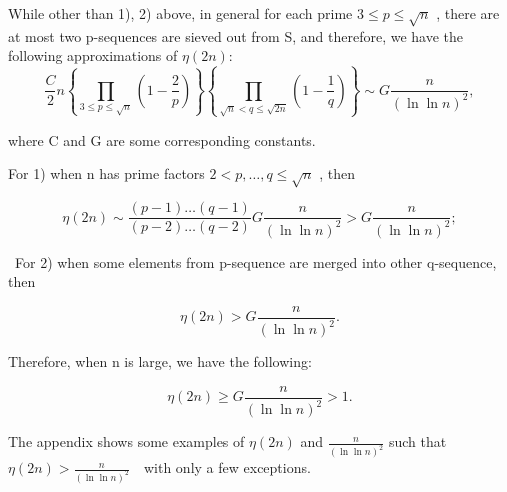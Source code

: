 \documentclass{article}
\begin{document}
\vspace{1\baselineskip}

While other than 1), 2) above, in general for each prime \( 3\leq p\leq\sqrt{n}\) , there are at most two p-sequences are sieved out from S, and therefore, we have the following approximations of \( \eta (2n)\):
\vspace{1\baselineskip}
\begin{equation}
\frac{C }{2} n\left\{  \prod_{3\leq p\leq\sqrt{n}}^{}\left(1-\frac{2}{p}\right)\right\}\left\{ \prod_{\sqrt{n}<q\leq\sqrt{2n}}^{}\left(1-\frac{1}{q}\right)\right\}  \sim  G\frac{n}{(\ln \ln  n)^{2}}   ,
\end{equation}

\vspace{1\baselineskip}

where C and G are some corresponding constants.
\vspace{1\baselineskip}

For 1) when n has prime factors \( 2<p, \ldots , q\leq\sqrt{n}\) {,  then }

\begin{equation}
\eta\left(2n\right)  \sim \frac{\left(p-1\right)\ldots (q-1)  }{\left(p-2\right)\ldots (q-2)  } G\frac{n}{(\ln \ln  n)^{2}} > G\frac{n}{(\ln \ln  n)^{2}} ;
\end{equation}

\vspace{1\baselineskip}


\ For 2) when some elements from p-sequence are merged into other q-sequence, then


\begin{equation}
    \eta\left(2n\right)> G\frac{n}{(\ln \ln  n)^{2}}  .
\end{equation}

\vspace{1\baselineskip}

Therefore, when n is large, we have the following:

\begin{equation}
    \eta\left(2n\right)\geq  G\frac{n}{(\ln \ln  n)^{2}}>1 .
\end{equation}
\vspace{1\baselineskip}

The appendix shows some examples of \( \eta\left(2n\right)\) and \(\frac{n}{(\ln \ln  n)^{2}}\) such that \( \eta\left(2n\right)>\frac{n}{(\ln \ln  n)^{2}}\)\ \ with only a few exceptions.  
\vspace{1\baselineskip}
\end{document}
